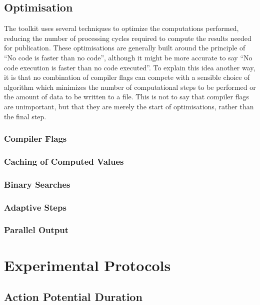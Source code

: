 \subsection{Optimisation}

The toolkit uses several techniques to optimize the computations performed,
reducing the number of processing cycles required to compute the results needed
for publication.  These optimisations are generally built around the principle
of ``No code is faster than no code'', although it might be more accurate to say
``No code execution is faster than no code executed''.  To explain this idea
another way, it is that no combination of compiler flags can compete with a
sensible choice of algorithm which minimizes the number of computational steps
to be performed or the amount of data to be written to a file.  This is not to
say that compiler flags are unimportant, but that they are merely the start of
optimisations, rather than the final step.

\subsubsection{Compiler Flags}



\subsubsection{Caching of Computed Values}

\subsubsection{Binary Searches}

\subsubsection{Adaptive Steps}

\subsubsection{Parallel Output}


\section{Experimental Protocols}



\subsection{Action Potential Duration}


